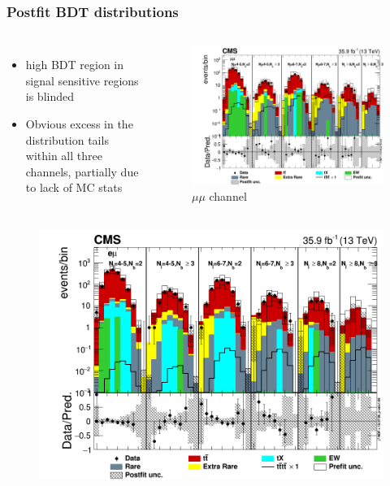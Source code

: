 \documentclass{beamer}
\begin{document}
\begin{frame}
\frametitle{Postfit BDT distributions}
\vspace{-10pt}
\begin{columns}
	\begin{itemize} \vspace{-10pt}
		\item high BDT region in signal sensitive regions is blinded
		\vspace{5pt}
		\item Obvious excess in the distribution tails within all three channels, partially due to lack of MC stats
	\end{itemize}
	\begin{figure} \vspace{-30pt}
		\includegraphics[width=0.8\linewidth]{hist_mumu_log.png}
		\caption{$\mu \mu$ channel}
	\end{figure}
\end{columns}
\begin{columns}
	\begin{figure} \vspace{-10pt}
		\includegraphics[width=0.8\linewidth]{hist_muel_log.png}

\end{figure}
\end{columns}
\end{frame}
\end{document}
